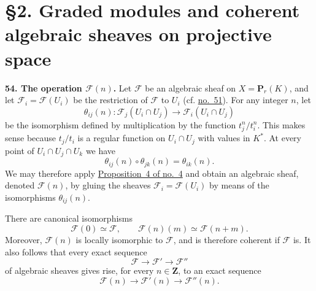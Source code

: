 
\label{fac:III:2}
\section*{\S2. Graded modules and coherent algebraic sheaves on projective space}

\label{fac:III:2:no:54}
\textbf{54. The operation $\mathcal{F}(n)$.}
\label{fac:III:2:no:54:construction:twist}
Let $\mathcal{F}$ be an algebraic sheaf on $X=\mathbf{P}_r(K)$, and let
$\mathcal{F}_i=\mathcal{F}(U_i)$ be the restriction of $\mathcal{F}$ to
$U_i$ (cf. \hyperref[fac:III:1:no:51]{no.~51}). For any integer $n$, let
\label{fac:III:2:no:54:theta}
\[
\theta_{ij}(n):\mathcal{F}_j(U_i\cap U_j)
  \longrightarrow\mathcal{F}_i(U_i\cap U_j)
\]
be the isomorphism defined by multiplication by the function
$t_j^n/t_i^n$. This makes sense because $t_j/t_i$ is a regular function on
$U_i\cap U_j$ with values in $K^*$. At every point of
$U_i\cap U_j\cap U_k$ we have
\[
\theta_{ij}(n)\circ\theta_{jk}(n)=\theta_{ik}(n).
\]
We may therefore apply \hyperref[fac:I:1:no:4:prop:4]{Proposition~4 of no.~4} and obtain an algebraic sheaf,
denoted $\mathcal{F}(n)$, by gluing the sheaves
$\mathcal{F}_i=\mathcal{F}(U_i)$ by means of the isomorphisms
$\theta_{ij}(n)$.

There are canonical isomorphisms
\label{fac:III:2:no:54:formula:canonical-isomorphisms}
\[
\mathcal{F}(0)\simeq\mathcal{F},
\qquad
\mathcal{F}(n)(m)\simeq\mathcal{F}(n+m).
\]
Moreover, $\mathcal{F}(n)$ is locally isomorphic to $\mathcal{F}$, and is
therefore coherent if $\mathcal{F}$ is. It also follows that every exact
sequence
\[
\mathcal{F}\longrightarrow\mathcal{F}'\longrightarrow\mathcal{F}''
\]
of algebraic sheaves gives rise, for every $n\in\mathbf{Z}$, to an exact
sequence
\[
\mathcal{F}(n)\longrightarrow\mathcal{F}'(n)
  \longrightarrow\mathcal{F}''(n).
\]

